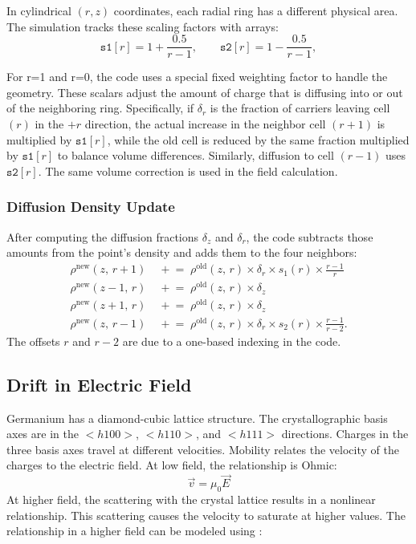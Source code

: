 In cylindrical $(r,z)$ coordinates, each radial ring has a different physical area. The simulation tracks these scaling factors with arrays:
\[
\texttt{s1}[r] = 1 + \frac{0.5}{r-1}, 
\qquad
\texttt{s2}[r] = 1 - \frac{0.5}{r-1},
\] 

For r=1 and r=0, the code uses a special fixed weighting factor to handle the geometry. These scalars adjust the amount of charge that is diffusing into or out of the neighboring ring. Specifically, if $\delta_r$ is the fraction of carriers leaving cell $(r)$ in
the $+r$ direction, the actual increase in the neighbor cell
$(r+1)$ is multiplied by $\texttt{s1}[r]$, while the old cell is
reduced by the same fraction multiplied by $\texttt{s1}[r]$ to
balance volume differences. Similarly, diffusion to cell $(r-1)$ 
uses $\texttt{s2}[r]$. The same volume correction is used in the field calculation.

\subsubsection*{Diffusion Density Update}

After computing the diffusion fractions $\delta_z$ and $\delta_r$, the code subtracts those amounts from the point's density and adds them to the four neighbors:
\begin{align}
  \rho^{\mathrm{new}}(z,\,r+1) &\;\mathrel{+}= \;\rho^{\mathrm{old}}(z,\,r)\times\delta_r \times s_1(r) \times \frac{r-1}{r} \label{ch3:eq:diffusion_update_1} \\
  \rho^{\mathrm{new}}(z-1,\,r) &\;\mathrel{+}= \;\rho^{\mathrm{old}}(z,\,r)\times\delta_z \label{ch3:eq:diffusion_update_2} \\
  \rho^{\mathrm{new}}(z+1,\,r) &\;\mathrel{+}= \;\rho^{\mathrm{old}}(z,\,r)\times\delta_z \label{ch3:eq:diffusion_update_3} \\
  \rho^{\mathrm{new}}(z,\,r-1) &\;\mathrel{+}= \;\rho^{\mathrm{old}}(z,\,r) \times \delta_r \times s_2(r) \times\frac{r-1}{r-2} \label{ch3:eq:diffusion_update_4}.
\end{align}
 The offsets $r$ and $r-2$ are due to a one-based indexing in the code.
 
\subsection{Drift in Electric Field}
Germanium has a diamond-cubic lattice structure. The crystallographic basis axes are in the $<h100>$, $<h110>$, and $<h111>$ directions. Charges in the three basis axes travel at different velocities. Mobility relates the velocity of the charges to the electric field. At low field, the relationship is Ohmic:
\begin{equation}
\vec{v} = \mu_0 \vec{E}
\end{equation}
At higher field, the scattering with the crystal lattice results in a nonlinear relationship. This scattering causes the velocity to saturate at higher values. The relationship in a higher field can be modeled using \cite{Caughey_1448053}:

